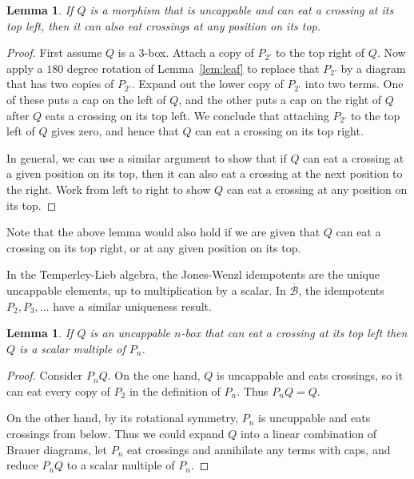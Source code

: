 \documentclass{article}
\newtheorem{lemma}[theorem]{Lemma}
\begin{document}
\begin{lemma}
If $Q$ is a morphism that is uncappable and can eat a crossing at its
top left, then it can also eat crossings at any position on its top.
\end{lemma}

\begin{proof}
First assume $Q$ is a $3$-box.  Attach a copy of $P_{2'}$ to the top
right of $Q$.  Now apply a $180$ degree rotation of Lemma~\ref{lem:leaf}
to replace that $P_{2'}$ by a diagram that has two copies of $P_{2'}$.
Expand out the lower copy of $P_{2'}$ into two terms.  One of these
puts a cap on the left of $Q$, and the other puts a cap on the right of
$Q$ after $Q$ eats a crossing on its top left.  We conclude that attaching
$P_{2'}$ to the top left of $Q$ gives zero, and hence that $Q$ can eat
a crossing on its top right.

In general, we can use a similar argument to show that if $Q$ can eat a
crossing at a given position on its top, then it can also eat a crossing
at the next position to the right.  Work from left to right to show $Q$
can eat a crossing at any position on its top.
\end{proof}

Note that the above lemma would also hold if we are given that $Q$
can eat a crossing on its top right, or at any given position on its top.

In the Temperley-Lieb algebra, the Jones-Wenzl idempotents are
the unique uncappable elements, up to multiplication by a scalar.
In $\overline{\mathcal{B}}$, the idempotents $P_2,P_3,\dots$ have a
similar uniqueness result.

\begin{lemma}
\label{lem:uniqueuptoscalar}
If $Q$ is an uncappable $n$-box that can eat a crossing at its top left
then $Q$ is a scalar multiple of $P_n$.
\end{lemma}

\begin{proof}
Consider $P_nQ$.  On the one hand, $Q$ is uncappable and eats crossings,
so it can eat every copy of $P_2$ in the definition of $P_n$.
Thus $P_nQ=Q$.

On the other hand, by its rotational symmetry, $P_n$ is uncuppable
and eats crossings from below.  Thus we could expand $Q$ into a linear
combination of Brauer diagrams, let $P_n$ eat crossings and annihilate
any terms with caps, and reduce $P_nQ$ to a scalar multiple of $P_n$.
\end{proof}
\end{document}

